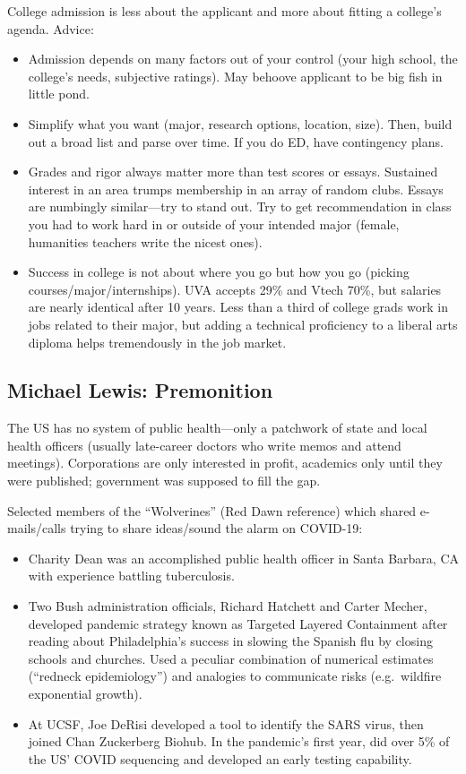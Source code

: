 \documentclass[
]{article}
\begin{document}
College admission is less about the applicant and more about fitting a
college's agenda. Advice:

\begin{itemize}
\item
  Admission depends on many factors out of your control (your high
  school, the college's needs, subjective ratings). May behoove
  applicant to be big fish in little pond.
\item
  Simplify what you want (major, research options, location, size).
  Then, build out a broad list and parse over time. If you do ED, have
  contingency plans.
\item
  Grades and rigor always matter more than test scores or essays.
  Sustained interest in an area trumps membership in an array of random
  clubs. Essays are numbingly similar---try to stand out. Try to get
  recommendation in class you had to work hard in or outside of your
  intended major (female, humanities teachers write the nicest ones).
\item
  Success in college is not about where you go but how you go (picking
  courses/major/internships). UVA accepts 29\% and Vtech 70\%, but
  salaries are nearly identical after 10 years. Less than a third of
  college grads work in jobs related to their major, but adding a
  technical proficiency to a liberal arts diploma helps tremendously in
  the job market.
\end{itemize}

\hypertarget{michael-lewis-premonition}{%
\subsection{Michael Lewis:
Premonition}\label{michael-lewis-premonition}}

The US has no system of public health---only a patchwork of state and
local health officers (usually late-career doctors who write memos and
attend meetings). Corporations are only interested in profit, academics
only until they were published; government was supposed to fill the gap.

Selected members of the ``Wolverines'' (Red Dawn reference) which shared
e-mails/calls trying to share ideas/sound the alarm on COVID-19:

\begin{itemize}
\item
  Charity Dean was an accomplished public health officer in Santa
  Barbara, CA with experience battling tuberculosis.
\item
  Two Bush administration officials, Richard Hatchett and Carter Mecher,
  developed pandemic strategy known as Targeted Layered Containment
  after reading about Philadelphia's success in slowing the Spanish flu
  by closing schools and churches. Used a peculiar combination of
  numerical estimates (``redneck epidemiology'') and analogies to
  communicate risks (e.g.~wildfire exponential growth).
\item
  At UCSF, Joe DeRisi developed a tool to identify the SARS virus, then
  joined Chan Zuckerberg Biohub. In the pandemic's first year, did over
  5\% of the US' COVID sequencing and developed an early testing
  capability.
\end{itemize}
\end{document}
